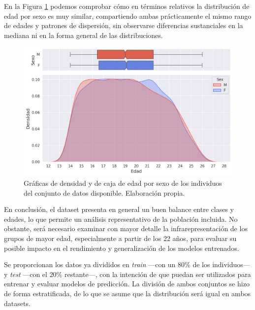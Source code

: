 En la Figura \ref{fig:kde_and_boxplot_ages_sex} podemos comprobar cómo en términos relativos la distribución 
de edad por sexo es muy similar, compartiendo ambas prácticamente el mismo rango de edades y patrones de 
dispersión, sin observarse diferencias sustanciales en la mediana ni en la forma general de las 
distribuciones.

\begin{figure}[H]
    \centering
    \includegraphics[width=\textwidth]{capitulos/cap_04/imagenes/kdeplot_ages.png}
    \caption[
        Gráficas de densidad y de caja de edad por sexo de los individuos del conjunto de datos disponible.
    ]{
        Gráficas de densidad y de caja de edad por sexo de los individuos del conjunto de datos disponible. 
        Elaboración propia.
    } 
    \label{fig:kde_and_boxplot_ages_sex}
\end{figure}

En conclusión, el dataset presenta en general un buen balance entre clases y edades, lo que permite un 
análisis representativo de la población incluida. No obstante, será necesario examinar con mayor detalle la 
infrarepresentación de los grupos de mayor edad, especialmente a partir de los 22 años, para evaluar su 
posible impacto en el rendimiento y generalización de los modelos entrenados.

Se proporcionan los datos ya divididos en \textit{train} ---con un 80\% de los individuos--- y \textit{test}
---con el 20\% restante---, con la intención de que puedan ser utilizados para entrenar y evaluar modelos de 
predicción. La división de ambos conjuntos se hizo de forma estratificada, de lo que se asume que la 
distribución será igual en ambos datasets. 


